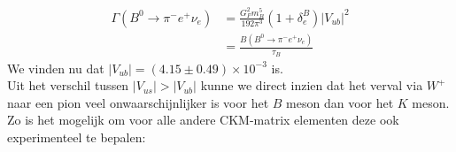 \documentclass[../main.tex]{subfiles}
\begin{document}
\begin{equation}
    \begin{aligned}
        \label{eq:b_zwak_verval}
        \Gamma\left(B^{0} \rightarrow \pi^{-} e^{+} \nu_{e}\right) &=\frac{G_{F}^{2} m_{B}^{5}}{192 \pi^{3}}\left(1+\delta_{e}^{B}\right)\left|V_{u b}\right|^{2} \\
                                                                   &=\frac{B\left(B^{0} \rightarrow \pi^{-} e^{+} \nu_{e}\right)}{\tau_{B}}
    \end{aligned}
\end{equation}
We vinden nu dat $\left|V_{u b}\right|=(4.15 \pm 0.49) \times 10^{-3}$ is.\\
Uit het verschil tussen $\left|V_{us}\right| > \left|V_{u b}\right|$ kunne we direct inzien dat het verval via $W^+$ naar een pion veel onwaarschijnlijker is voor het $B$ meson dan voor het $K$ meson.\\
Zo is het mogelijk om voor alle andere CKM-matrix elementen deze ook experimenteel te bepalen:
\end{document}
